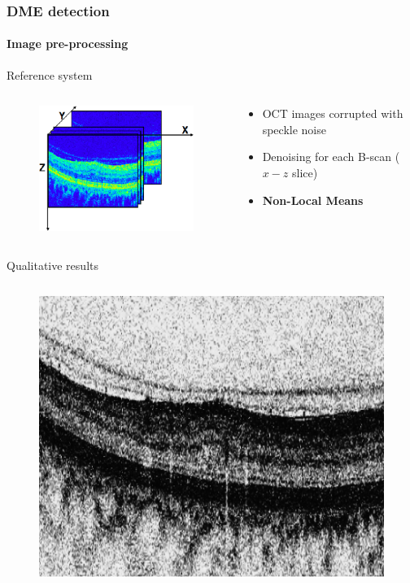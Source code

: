 \documentclass{beamer}
\begin{document}
\begin{frame}
  \frametitle{DME detection}
  \framesubtitle{Image pre-processing}
  \begin{block}{Reference system}
    \begin{columns}
      \begin{column}{.3\linewidth}
        \begin{figure}
          \centering
          \includegraphics[width=.6\textwidth]{./images/volume.png}
        \end{figure}
      \end{column}
      \begin{column}{.6\linewidth}
        \begin{itemize}[leftmargin=*]\footnotesize
        \item OCT images corrupted with speckle noise
        \item Denoising for each B-scan ($x-z$ slice)
        \item \textbf{Non-Local Means}~\footnotemark
        \end{itemize}
      \end{column}
    \end{columns}
  \end{block}
  \begin{block}{Qualitative results}
    \begin{columns}
      \begin{column}{.5\linewidth}
        \begin{figure}
          \centering
          \includegraphics[width=.4\textwidth]{./images/raw_crop_grey.png}

\end{figure}
\end{column}
\end{columns}
\end{block}
\end{frame}
\end{document}
